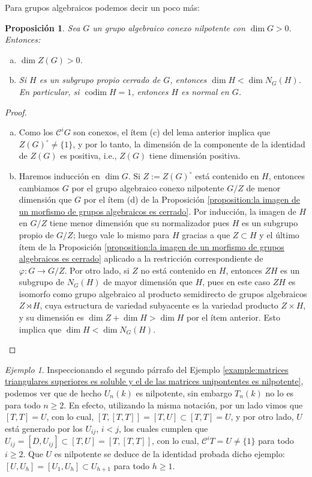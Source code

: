 \documentclass[spanish,12pt]{amsart}
\newtheorem{proposition}[theorem]{Proposición}
\theoremstyle{definition}
\theoremstyle{remark}
\newtheorem{example}[theorem]{Ejemplo}
\numberwithin{equation}{section}
\begin{document}
Para grupos algebraicos podemos decir un poco más:
\begin{proposition}
Sea $G$ un grupo algebraico conexo nilpotente con $\dim G > 0$. Entonces:
\begin{enumerate}[(a)]
\item $\dim Z(G) > 0$.
\item Si $H$ es un subgrupo propio cerrado de $G$, entonces $\dim H < \dim N_G (H)$. En particular, si $\operatorname{codim} H = 1$, entonces $H$ es normal en $G$.
\end{enumerate}
\end{proposition}
\begin{proof}
\begin{enumerate}[(a)]
\item Como los $\mathcal C^i G$ son conexos, el ítem (c) del lema anterior implica que $Z(G)^\circ \neq \{1\}$, y por lo tanto, la dimensión de la componente de la identidad de $Z(G)$ es positiva, i.e., $Z(G)$ tiene dimensión positiva.
\item Haremos inducción en $\dim G$. Si $Z := Z(G)^\circ$ está contenido en $H$, entonces cambiamos $G$ por el grupo algebraico conexo nilpotente $G/Z$ de menor dimensión que $G$ por el ítem (d) de la Proposición \ref{proposition:la imagen de un morfismo de grupos algebraicos es cerrado}. Por inducción, la imagen de $H$ en $G/Z$ tiene menor dimensión que su normalizador pues $H$ es un subgrupo propio de $G/Z$; luego vale lo mismo para $H$ gracias a que $Z \subset H$ y el último ítem de la Proposición \ref{proposition:la imagen de un morfismo de grupos algebraicos es cerrado} aplicado a la restricción correspondiente de $\varphi : G \to G/Z$. Por otro lado, si $Z$ no está contenido en $H$, entonces $ZH$ es un subgrupo de $N_G (H)$ de mayor dimensión que $H$, pues en este caso $ZH$ es isomorfo como grupo algebraico al producto semidirecto de grupos algebraicos $Z \rtimes H$, cuya estructura de variedad subyacente es la variedad producto $Z \times H$, y su dimensión es $\dim Z + \dim H > \dim H$ por el ítem anterior. Esto implica que $\dim H < \dim N_G (H)$.
\end{enumerate}
\end{proof}

\begin{example}
Inspeccionando el segundo párrafo del Ejemplo \ref{example:matrices triangulares superiores es soluble y el de las matrices unipontentes es nilpotente}, podemos ver que de hecho $U_n (k)$ es nilpotente, sin embargo $T_n (k)$ no lo es para todo $n \geq 2$. En efecto, utilizando la misma notación, por un lado vimos que $[T,T] = U$, con lo cual, $[T,[T,T]] = [T,U] \subset [T,T] = U$, y por otro lado, $U$ está generado por los $U_{ij}$, $i< j$, los cuales cumplen que $U_{ij} = [D, U_{ij}] \subset [T,U] = [T,[T,T]]$, con lo cual, $\mathcal C^i T = U \neq \{1\}$ para todo $i \geq 2$. Que $U$ es nilpotente se deduce de la identidad probada dicho ejemplo: $[U, U_h] = [U_1, U_h] \subset U_{h+1}$ para todo $h \geq 1$.
\end{example}
\end{document}
